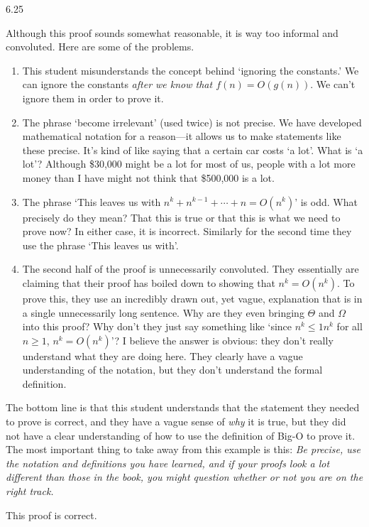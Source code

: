 \begin{Answer}{6.25}
\begin{solevalenum}
\item
Although this proof sounds somewhat reasonable, it is way too informal and convoluted.  Here are
some of the problems.
\begin{enumerate}
\item
This student misunderstands the concept behind `ignoring the constants.'
We can ignore the constants {\em after we know that $f(n)=O(g(n))$}.  We can't ignore them
in order to prove it.
\item
The phrase `become irrelevant' (used twice) is not precise.
We have developed mathematical notation for
a reason---it allows us to make statements like these precise.
It's kind of like saying that a certain car costs `a lot'.  What is `a lot'?
Although \$30,000 might be a lot for most of us, people with a lot more money
than I have might not think that \$500,000 is a lot.
\item
The phrase `This leaves us with $n^k+n^{k-1}+\cdots+n=O(n^k)$' is odd.  What precisely do they mean?
That this is true or that this is what we need to prove now?  In either case, it is incorrect.
Similarly for the second time they use the phrase `This leaves us with'.
\item
The second half of the proof is unnecessarily convoluted.  They essentially are claiming that their
proof has boiled down to showing that $n^k=O(n^k)$.
To prove this, they use an incredibly drawn out, yet vague, explanation that is
in a single unnecessarily long sentence.  Why are they even bringing $\Theta$ and $\Omega$ into this proof?
Why don't they just say something like `since $n^k\leq 1n^k$ for all $n\geq 1$, $n^k=O(n^k)$'?
I believe the answer is obvious:  they don't really understand what they are doing here.
They clearly have a vague understanding of the notation, but they don't understand the
formal definition.
\end{enumerate}
The bottom line is that this student understands that the statement they needed to prove is correct,
and they have a vague sense of {\em why} it is true, but they did not have a clear understanding
of how to use the definition of Big-O to prove it.
The most important thing to take away from this example is this:
{\em Be precise, use the notation and
definitions you have learned, and if your proofs look a lot different than those in the book, you
might question whether or not you are on the right track.}
\item
This proof is correct.
\end{solevalenum}
\end{Answer}
